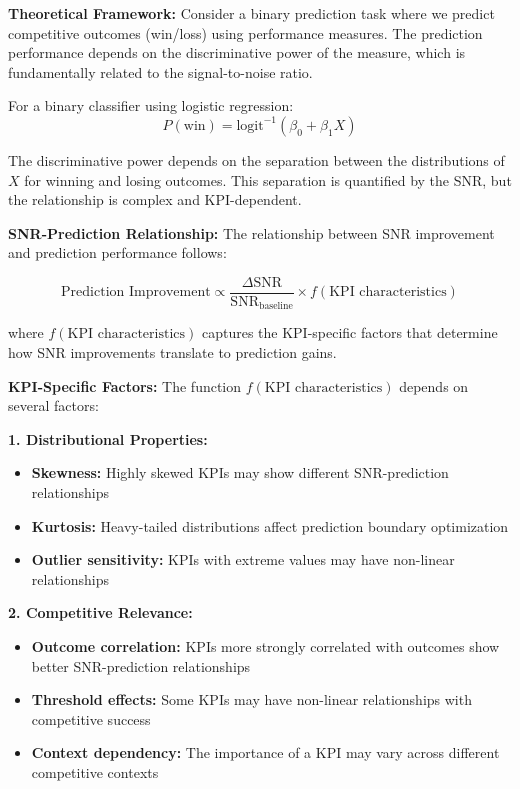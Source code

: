 \textbf{Theoretical Framework:}
Consider a binary prediction task where we predict competitive outcomes (win/loss) using performance measures. The prediction performance depends on the discriminative power of the measure, which is fundamentally related to the signal-to-noise ratio.

For a binary classifier using logistic regression:
$$P(\text{win}) = \text{logit}^{-1}(\beta_0 + \beta_1 X)$$

The discriminative power depends on the separation between the distributions of $X$ for winning and losing outcomes. This separation is quantified by the SNR, but the relationship is complex and KPI-dependent.

\textbf{SNR-Prediction Relationship:}
The relationship between SNR improvement and prediction performance follows:

$$\text{Prediction Improvement} \propto \frac{\Delta \text{SNR}}{\text{SNR}_{\text{baseline}}} \times f(\text{KPI characteristics})$$

where $f(\text{KPI characteristics})$ captures the KPI-specific factors that determine how SNR improvements translate to prediction gains.

\textbf{KPI-Specific Factors:}
The function $f(\text{KPI characteristics})$ depends on several factors:

\textbf{1. Distributional Properties:}
\begin{itemize}
    \item \textbf{Skewness:} Highly skewed KPIs may show different SNR-prediction relationships
    \item \textbf{Kurtosis:} Heavy-tailed distributions affect prediction boundary optimization
    \item \textbf{Outlier sensitivity:} KPIs with extreme values may have non-linear relationships
\end{itemize}

\textbf{2. Competitive Relevance:}
\begin{itemize}
    \item \textbf{Outcome correlation:} KPIs more strongly correlated with outcomes show better SNR-prediction relationships
    \item \textbf{Threshold effects:} Some KPIs may have non-linear relationships with competitive success
    \item \textbf{Context dependency:} The importance of a KPI may vary across different competitive contexts
\end{itemize}

